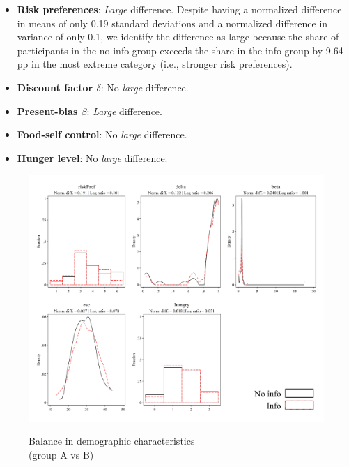 \documentclass[12pt]{article}
\begin{document}
\begin{itemize}
  \item \textbf{Risk preferences}: \emph{Large} difference.
  Despite having a normalized difference in means of only 0.19 standard deviations and a normalized difference in variance of only 0.1, we identify the difference as large because the share of participants in the no info group exceeds the share in the info group by 9.64 pp in the most extreme category (i.e., stronger risk preferences).

  \item \textbf{Discount factor $\delta$}: No \emph{large} difference.

  \item \textbf{Present-bias $\beta$}: \emph{Large} difference.

  \item \textbf{Food-self control}: No \emph{large} difference.

  \item \textbf{Hunger level}: No \emph{large} difference.
\end{itemize}

\begin{figure}[ht]
  \caption{Balance in demographic characteristics \\ (group A vs B)}\label{fig:group2_attitudes}
  \begin{center}
  {\includegraphics[width=1\textwidth]{./figures/covDifTreat_0_attitudes.png}}
  \end{center}
\end{figure}
\end{document}
